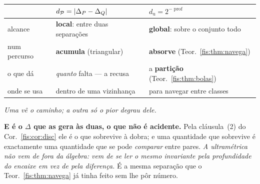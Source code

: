 \documentclass[livro.tex]{subfiles}
\begin{document}
\begin{center}\footnotesize
\begin{tabular}{@{}lll@{}}
\toprule
 & $d_{\mathcal{P}}=\lvert \Delta_P-\Delta_Q\rvert$ & $d_{\mathrm{u}}=2^{-\operatorname{prof}}$ \\
\midrule
alcance & \textbf{local}: entre duas separações & \textbf{global}: sobre o conjunto todo \\
num percurso & \textbf{acumula} (triangular) & \textbf{absorve} (Teor.~\ref{fis:thm:navega}) \\
o que dá & \emph{quanto} falta --- a recusa & a \textbf{partição} (Teor.~\ref{fis:thm:bolas}) \\
onde se usa & dentro de uma vizinhança & para navegar entre classes \\
\bottomrule
\end{tabular}
\end{center}
\noindent \emph{Uma vê o caminho; a outra só o pior degrau dele.}

\medskip\noindent\textbf{E é o $\Delta$ que as gera às duas, o que não é
acidente.} Pela cláusula~(2) do Cor.~\ref{fis:cor:disc} ele é o que sobrevive à
dobra; e uma quantidade que sobrevive é exactamente uma quantidade que se pode
\emph{comparar} entre pares. \emph{A ultramétrica não vem de fora da álgebra:
vem de se ler o mesmo invariante pela profundidade do encaixe em vez de pela
diferença.} É a mesma separação que o Teor.~\ref{fis:thm:navega} já tinha feito
sem lhe pôr número.

\end{document}

